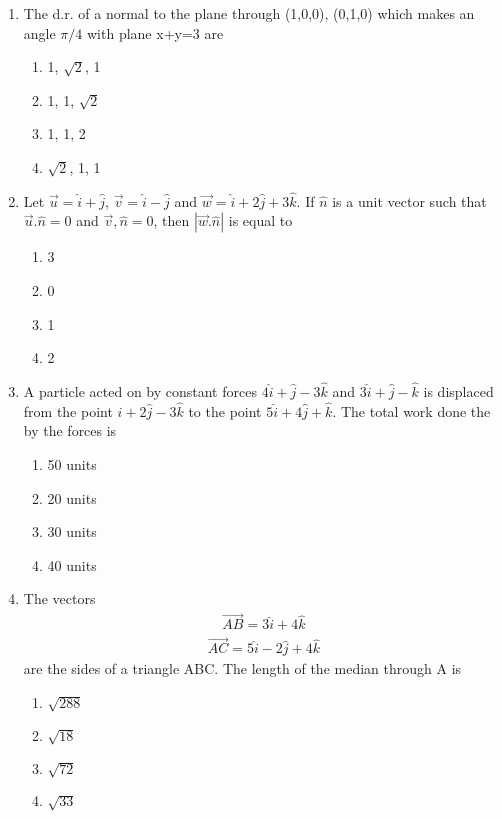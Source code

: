 \begin{enumerate}[label=\arabic*.,ref=\thesubsection.\theenumi]
\item The d.r. of a normal to the plane through (1,0,0), (0,1,0) which makes an angle $\pi/4$ with plane x+y=3 are
\begin{enumerate}
\item 1, $\sqrt{2}$, 1
\item 1, 1, $\sqrt{2}$
\item 1, 1, 2
\item $\sqrt{2}$, 1, 1
\end{enumerate}

\item Let $\overrightarrow{u}=\hat{i}+\hat{j}$, $\overrightarrow{v}=\hat{i}-\hat{j}$ and $\overrightarrow{w}=\hat{i}+2\hat{j}+3\hat{k}$. If $\hat{n}$ is a unit vector such that $\overrightarrow{u}.\hat{n}=0$ and $\overrightarrow{v},\hat{n}=0$, then $|\overrightarrow{w}.\hat{n}|$ is equal to
\begin{enumerate}
\item 3
\item 0
\item 1
\item 2
\end{enumerate}

\item A particle acted on by constant forces $4\hat{i}+\hat{j}-3\hat{k}$ and $3\hat{i}+\hat{j}-\hat{k}$ is displaced from the point $\hat{i}+2\hat{j}-3\hat{k}$ to the point $5\hat{i}+4\hat{j}+\hat{k}$. The total work done the by the forces is
\begin{enumerate}
\item 50 units
\item 20 units
\item 30 units
\item 40 units
\end{enumerate}

\item The vectors 
\begin{align*}
\overrightarrow{AB} = 3\hat{i} + 4\hat{k} 
\end{align*}
\begin{align*}
\overrightarrow{AC} = 5\hat{i} - 2\hat{j} + 4\hat{k}
\end{align*}
 are the sides of a triangle ABC. The length of the median through A is
\begin{enumerate}
\item $\sqrt{288}$
\item $\sqrt{18}$
\item $\sqrt{72}$
\item $\sqrt{33}$
\end{enumerate}


\end{enumerate}
